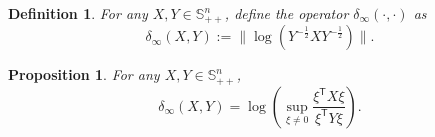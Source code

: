 \documentclass{article}
\newcommand{\transpose}{\mathsf{T}}
\newtheorem{lemma}{Lemma}
\newtheorem{definition}{Definition}
\newtheorem{proposition}{Proposition}
\begin{document}

\begin{definition}
    For any $X,Y\in \mathbb{S}_{++}^{n}$, define the operator $\delta_{\infty}(\cdot, \cdot)$ as
    \begin{equation*}
        \delta_{\infty}(X, Y) := \| \log(Y^{-\frac{1}{2}}XY^{-\frac{1}{2}})\|.
    \end{equation*}
\end{definition}

\begin{proposition}\label{proposition:deltaRatio}
    For any $X,Y\in \mathbb{S}_{++}^{n}$,
    \begin{equation}
        \delta_{\infty}(X,Y) = \log(\sup_{\xi\neq0} \frac{\xi^{\transpose}X\xi}{\xi^{\transpose}Y\xi}).
    \end{equation}
\end{proposition}
\end{document}
